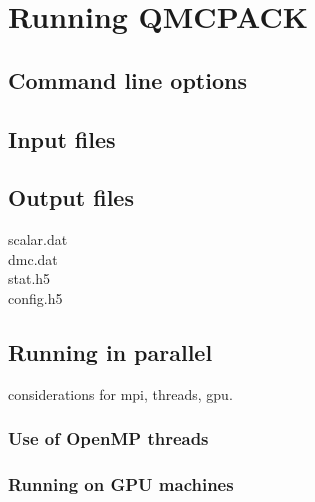 \chapter{Running QMCPACK}

\section{Command line options}

\section{Input files}

\section{Output files}
  scalar.dat\\
  dmc.dat\\
  stat.h5\\
  config.h5

\section{Running in parallel}
considerations for mpi, threads, gpu.

\subsection{Use of OpenMP threads}

\subsection{Running on GPU machines}
